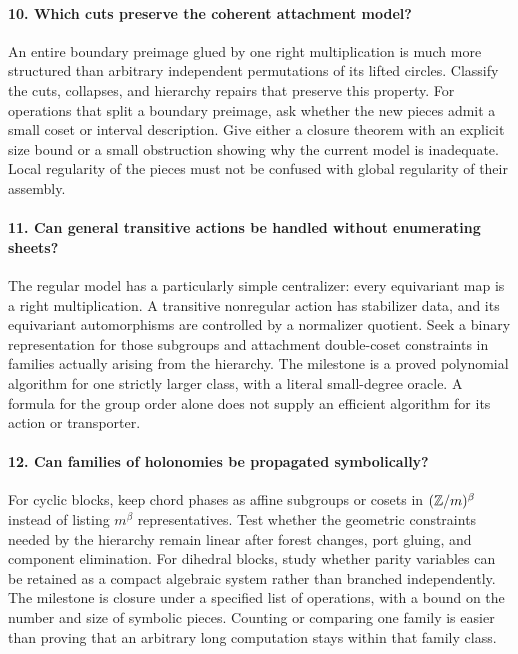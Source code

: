 \paragraph{10. Which cuts preserve the coherent attachment model?}
An entire boundary preimage glued by one right multiplication is much more
structured than arbitrary independent permutations of its lifted circles.
Classify the cuts, collapses, and hierarchy repairs that preserve this
property. For operations that split a boundary preimage, ask whether the
new pieces admit a small coset or interval description. Give either a
closure theorem with an explicit size bound or a small obstruction showing
why the current model is inadequate. Local regularity of the pieces must
not be confused with global regularity of their assembly.

\paragraph{11. Can general transitive actions be handled without enumerating sheets?}
The regular model has a particularly simple centralizer: every equivariant
map is a right multiplication. A transitive nonregular action has stabilizer
data, and its equivariant automorphisms are controlled by a normalizer
quotient. Seek a binary representation for those subgroups and attachment
double-coset constraints in families actually arising from the hierarchy.
The milestone is a proved polynomial algorithm for one strictly larger
class, with a literal small-degree oracle. A formula for the group order
alone does not supply an efficient algorithm for its action or transporter.

\paragraph{12. Can families of holonomies be propagated symbolically?}
For cyclic blocks, keep chord phases as affine subgroups or cosets in
$(\mathbb Z/m)^\beta$ instead of listing $m^\beta$ representatives. Test whether
the geometric constraints needed by the hierarchy remain linear after
forest changes, port gluing, and component elimination. For dihedral blocks,
study whether parity variables can be retained as a compact algebraic
system rather than branched independently. The milestone is closure under
a specified list of operations, with a bound on the number and size of
symbolic pieces. Counting or comparing one family is easier than proving
that an arbitrary long computation stays within that family class.

